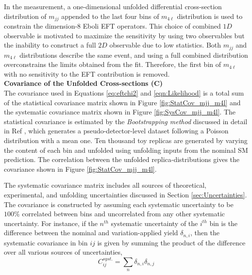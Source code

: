 In the measurement, a one-dimensional unfolded differential cross-section distribution of $m_{jj}$ appended to the last four bins of $m_{4\ell}$ distribution is used to constrain the dimension-8 Eboli EFT operators. This choice of combined $1D$ observable is motivated to maximize the sensitivity by using two observables but the inability to construct a full $2D$ observable due to low statistics. Both $m_{jj}$ and $m_{4\ell}$ distributions describe the same event, and using a full combined distribution overconstrains the limits obtained from the fit. Therefore, the first bin of $m_{4\ell}$ with no sensitivity to the EFT contribution is removed. \\
\textbf{Covariance of the Unfolded Cross-sections (C)}\\
The covariance used in Equations \ref{eq:eftchi2} and \ref{eqn:Likelihood} is a total sum of the statistical covariance matrix shown in Figure \ref{fig:StatCov_mjj_m4l} and the systematic covariance matrix shown in Figure \ref{fig:SysCov_mjj_m4l}. The statistical covariance is estimated by the \textit{Bootstrapping method} discussed in detail in Ref \cite{Bootstrapping}, which generates a pseudo-detector-level dataset following a Poisson distribution with a mean one. Ten thousand toy replicas are generated by varying the content of each bin and unfolded using unfolding inputs from the nominal SM prediction. The correlation between the unfolded replica-distributions gives the covariance shown in Figure \ref{fig:StatCov_mjj_m4l}.

The systematic covariance matrix includes all sources of theoretical, experimental, and unfolding uncertainties discussed in Section \ref{sec:Uncertainties}. The covariance is constructed by assuming each systematic uncertainty to be $100\%$ correlated between bins and uncorrelated from any other systematic uncertainty. For instance, if the $n^{th}$ systematic uncertainty of the $i^{th}$ bin is the difference between the nominal and variation-applied yield $\delta_{n, i}$, then the systematic covariance in bin $ij$ is given by summing the product of the difference over all various sources of uncertainties,
\begin{equation}
C^{syst.}_{ij} = \sum_{n}\delta_{n, i}\delta_{n, j}
\end{equation} 

